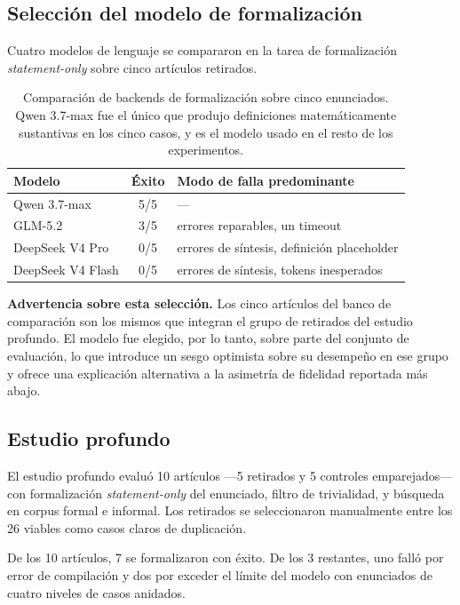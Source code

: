 \documentclass[12pt,a4paper]{article}
\theoremstyle{remark}
\begin{document}
\subsection{Selección del modelo de formalización}

Cuatro modelos de lenguaje se compararon en la tarea de formalización \textit{statement-only} sobre cinco artículos retirados.

\begin{table}[htbp]
\centering
\small
\begin{tabular}{lcl}
\toprule
Modelo & Éxito & Modo de falla predominante \\
\midrule
Qwen 3.7-max      & 5/5 & --- \\
GLM-5.2           & 3/5 & errores reparables, un timeout \\
DeepSeek V4 Pro   & 0/5 & errores de síntesis, definición placeholder \\
DeepSeek V4 Flash & 0/5 & errores de síntesis, tokens inesperados \\
\bottomrule
\end{tabular}
\caption{Comparación de backends de formalización sobre cinco enunciados. Qwen 3.7-max fue el único que produjo definiciones matemáticamente sustantivas en los cinco casos, y es el modelo usado en el resto de los experimentos.}
\label{tab:modelos}
\end{table}

\textbf{Advertencia sobre esta selección.} Los cinco artículos del banco de comparación son los mismos que integran el grupo de retirados del estudio profundo. El modelo fue elegido, por lo tanto, sobre parte del conjunto de evaluación, lo que introduce un sesgo optimista sobre su desempeño en ese grupo y ofrece una explicación alternativa a la asimetría de fidelidad reportada más abajo.

\subsection{Estudio profundo}

El estudio profundo evaluó 10 artículos —5 retirados y 5 controles emparejados— con formalización \textit{statement-only} del enunciado, filtro de trivialidad, y búsqueda en corpus formal e informal. Los retirados se seleccionaron manualmente entre los 26 viables como casos claros de duplicación.

De los 10 artículos, 7 se formalizaron con éxito. De los 3 restantes, uno falló por error de compilación y dos por exceder el límite del modelo con enunciados de cuatro niveles de casos anidados.
\end{document}

